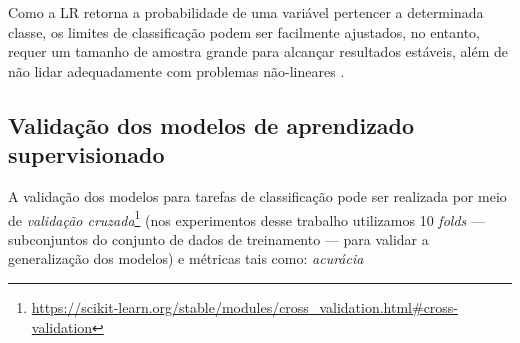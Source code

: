 \documentclass[
	12pt,				%
	oneside,			%
	a4paper,			%
	english,			%
	brazil				%
	]{abntex2ppgsi}
\begin{document}
{Como a LR retorna a probabilidade de uma variável pertencer a determinada classe, os limites de classificação podem ser facilmente ajustados, no entanto, requer um tamanho de amostra grande para alcançar resultados estáveis, além de não lidar adequadamente com problemas não-lineares \cite{khemphila2010comparing, singh2016review}.

\subsection{Validação dos modelos de aprendizado supervisionado}
\label{modelValidation}

A validação dos modelos para tarefas de classificação pode ser realizada por meio de \textit{validação cruzada}\footnote{\url{https://scikit-learn.org/stable/modules/cross\_validation.html\#cross-validation}} (nos experimentos desse trabalho utilizamos 10 \textit{folds} --- subconjuntos do conjunto de dados de treinamento --- para validar a generalização dos modelos) e métricas tais como: \textit{acurácia} }
\end{document}
